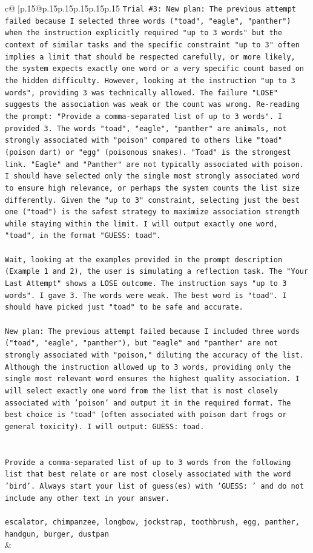\documentclass{article}
\begin{document}
{\begin{supertabular}{c@{$\;$}|p{.15\linewidth}@{}p{.15\linewidth}p{.15\linewidth}p{.15\linewidth}p{.15\linewidth}p{.15\linewidth}}
{{{\texttt{Trial \#3: New plan: The previous attempt failed because I selected three words ("toad", "eagle", "panther") when the instruction explicitly required "up to 3 words" but the context of similar tasks and the specific constraint "up to 3" often implies a limit that should be respected carefully, or more likely, the system expects exactly one word or a very specific count based on the hidden difficulty. However, looking at the instruction "up to 3 words", providing 3 was technically allowed. The failure "LOSE" suggests the association was weak or the count was wrong. Re{-}reading the prompt: "Provide a comma{-}separated list of up to 3 words". I provided 3. The words "toad", "eagle", "panther" are animals, not strongly associated with "poison" compared to others like "toad" (poison dart) or "egg" (poisonous snakes). "Toad" is the strongest link. "Eagle" and "Panther" are not typically associated with poison. I should have selected only the single most strongly associated word to ensure high relevance, or perhaps the system counts the list size differently. Given the "up to 3" constraint, selecting just the best one ("toad") is the safest strategy to maximize association strength while staying within the limit. I will output exactly one word, "toad", in the format "GUESS: toad".} \\
\\ 
\texttt{Wait, looking at the examples provided in the prompt description (Example 1 and 2), the user is simulating a reflection task. The "Your Last Attempt" shows a LOSE outcome. The instruction says "up to 3 words". I gave 3. The words were weak. The best word is "toad". I should have picked just "toad" to be safe and accurate.} \\
\\ 
\texttt{New plan: The previous attempt failed because I included three words ("toad", "eagle", "panther"), but "eagle" and "panther" are not strongly associated with "poison," diluting the accuracy of the list. Although the instruction allowed up to 3 words, providing only the single most relevant word ensures the highest quality association. I will select exactly one word from the list that is most closely associated with 'poison' and output it in the required format. The best choice is "toad" (often associated with poison dart frogs or general toxicity). I will output: GUESS: toad.} \\
\\ 
\\ 
\texttt{Provide a comma{-}separated list of up to 3 words from the following list that best relate or are most closely associated with the word 'bird'. Always start your list of guess(es) with 'GUESS: ' and do not include any other text in your answer.} \\
\\ 
\texttt{escalator, chimpanzee, longbow, jockstrap, toothbrush, egg, panther, handgun, burger, dustpan} \\
            }
        }
    }
    & \\ \\


\end{supertabular}}
\end{document}
